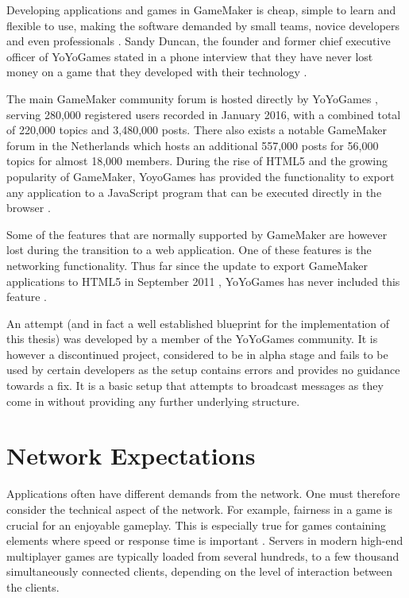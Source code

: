 \documentclass[bsc, 12pt, twoside, singlespacing, parskip, abbrevs, notimes, normalheadings, logo]{styles/infthesis}
\begin{document}
Developing applications and games in GameMaker is cheap, simple to learn and flexible to use, making the software demanded by small teams, novice developers and even professionals \cite{Mark_Overmars}. Sandy Duncan, the founder and former chief executive officer of YoYoGames stated in a phone interview that they have never lost money on a game that they developed with their technology \cite{Gamemaker_DnD}.

The main GameMaker community forum is hosted directly by YoYoGames \cite{yoyogames_forum}, serving 280,000 registered users recorded in January 2016, with a combined total of 220,000 topics and 3,480,000 posts. There also exists a notable GameMaker forum in the Netherlands \cite{dutch_gamemaker_forum} which hosts an additional 557,000 posts for 56,000 topics for almost 18,000 members. During the rise of HTML5 and the growing popularity of GameMaker, YoyoGames has provided the functionality to export any application to a JavaScript program that can be executed directly in the browser \cite{GameMaker_Studio}.

Some of the features that are normally supported by GameMaker are however lost during the transition to a web application. One of these features is the networking functionality. Thus far since the update to export GameMaker applications to HTML5 in September 2011 \cite{HTML5_Game_Dev_Gamemaker}, YoYoGames has never included this feature \cite{gamemaker_missing_networking}.

An attempt (and in fact a well established blueprint for the implementation of this thesis) was developed by a member of the YoYoGames community. It is however a discontinued project, considered to be in alpha stage and fails to be used by certain developers \cite{gamemaker_networking_attempt} as the setup contains errors and provides no guidance towards a fix. It is a basic setup that attempts to broadcast messages as they come in without providing any further underlying structure.


\section{Network Expectations}
Applications often have different demands from the network. One must therefore consider the technical aspect of the network. For example, fairness in a game is crucial for an enjoyable gameplay. This is especially true for games containing elements where speed or response time is important \cite{Fairness_and_Playability}. Servers in modern high-end multiplayer games are typically loaded from several hundreds, to a few thousand simultaneously connected clients, depending on the level of interaction between the clients.
\end{document}
